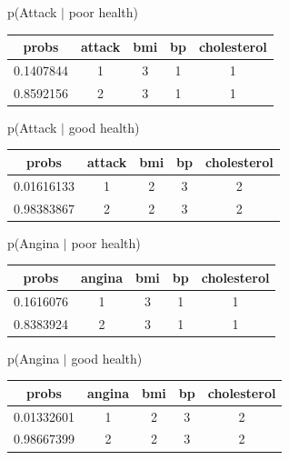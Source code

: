 \documentclass[11pt]{article}
\begin{document}

p(Attack $|$ poor health)

\begin{table}[!hbt]
\begin{center}
\begin{tabular}{ |c|c|c|c|c| }
  \hline
  probs & attack & bmi & bp & cholesterol \\
  \hline
  0.1407844 & 1 & 3 & 1 & 1\\
  \hline
  0.8592156 & 2 & 3 & 1 & 1 \\
  \hline
\end{tabular}
\end{center}
\end{table}
\vspace{-20pt}

p(Attack $|$ good health)

\begin{table}[!hbt]
\begin{center}
\begin{tabular}{ |c|c|c|c|c| }
  \hline
  probs & attack & bmi & bp & cholesterol \\
  \hline
  0.01616133 & 1 & 2 & 3 & 2\\
  \hline
  0.98383867 & 2 & 2 & 3 & 2 \\
  \hline
\end{tabular}
\end{center}
\end{table}
\vspace{-20pt}


p(Angina $|$ poor health)

\begin{table}[!hbt]
\begin{center}
\begin{tabular}{ |c|c|c|c|c| }
  \hline
  probs & angina & bmi & bp & cholesterol \\
  \hline
  0.1616076 & 1 & 3 & 1 & 1\\
  \hline
  0.8383924 & 2 & 3 & 1 & 1 \\
  \hline
\end{tabular}
\end{center}
\end{table}
\vspace{-20pt}

p(Angina $|$ good health)

\begin{table}[!hbt]
\begin{center}
\begin{tabular}{ |c|c|c|c|c| }
  \hline
  probs & angina & bmi & bp & cholesterol \\
  \hline
  0.01332601 & 1 & 2 & 3 & 2\\
  \hline
  0.98667399 & 2 & 2 & 3 & 2 \\
  \hline
\end{tabular}
\end{center}
\end{table}
\vspace{-20pt}
\end{document}
